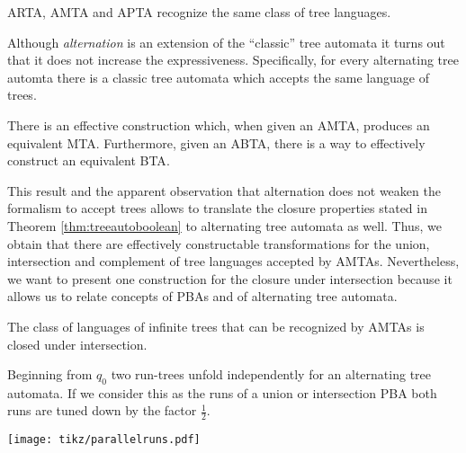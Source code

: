 \begin{theorem}
  \ac{ARTA}, \ac{AMTA} and \ac{APTA} recognize the same class of tree
  languages.
  \label{thm:atreeautoequiv}
\end{theorem}
Although \emph{alternation} is an extension of the \enquote{classic} tree 
automata it turns out that it does not increase the expressiveness.
Specifically, for every alternating tree automta there is a classic tree
automata which accepts the same language of trees.
\begin{theorem}
  \cite[Theorem 1.2]{SimAltTreeAuto}
  There is an effective construction which, when given an \ac{AMTA}, produces 
  an equivalent \ac{MTA}. Furthermore, given an \ac{ABTA}, there is a way to 
  effectively construct an equivalent \ac{BTA}.
  \label{thm:treesimulation}
\end{theorem}
This result and the apparent observation that alternation does not weaken the 
formalism to accept trees allows to translate the closure properties stated in 
Theorem \ref{thm:treeautoboolean} to alternating tree automata as well. Thus, 
we obtain that there are effectively constructable transformations for the 
union, intersection and complement of tree languages accepted by \acp{AMTA}. 
Nevertheless, we want to present one construction for the closure under 
intersection because it allows us to relate concepts of \acp{PBA} and of
alternating tree automata.
\begin{corollary}
  The class of languages of infinite trees that can be recognized by \acp{AMTA}
  is closed under intersection.
  \label{cor:treeintersection}
\end{corollary}
\begin{drawing}
  \caption{Beginning from $q_{0}$ two run-trees unfold independently for an
  alternating tree automata. If we consider this as the runs of a union or
  intersection \ac{PBA} both runs are tuned down by the factor $\frac{1}{2}$.}
  \label{fig:parallelruns}
  \begin{center}
    \texttt{[image: tikz/parallelruns.pdf]}
  \end{center}
\end{drawing}
